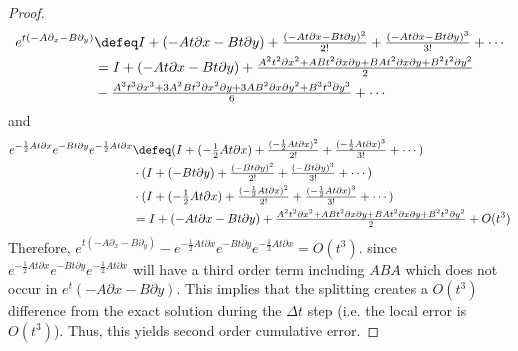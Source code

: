 \begin{answer}
\begin{proof}
        \begin{align}
            e^{t(-A\partial_x - B\partial_y)} &\defeq I + (-At\partial x - Bt\partial y) + \tfrac{(-At\partial x-Bt\partial y)^2}{2!} + \tfrac{(-At\partial x-Bt\partial y)^3}{3!} + \cdots\\
            &= I + (-At\partial x - Bt\partial y) + \tfrac{A^2t^2\partial x^2 + ABt^2\partial x \partial y + BA t^2 \partial x \partial y + B^2t^2\partial y^2}{2}\\
            &- \tfrac{A^3t^3\partial x^3 + 3A^2Bt^3\partial x^2 \partial y + 3AB^2 \partial x \partial y^2 + B^3t^3\partial y^3}{6} + \cdots
        \end{align}
        and
        \begin{align}
            e^{-\frac{1}{2}At\partial x}e^{-Bt\partial y}e^{-\frac{1}{2}At\partial x} &\defeq (I + (-\tfrac{1}{2}At\partial x) + \tfrac{(-\frac{1}{2}At \partial x)^2}{2!} + \tfrac{(-\frac{1}{2}At \partial x)^3}{3!} + \cdots)\\
            &\cdot(I + (-Bt\partial y) + \tfrac{(-Bt \partial y)^2}{2!} + \tfrac{(-Bt \partial y)^3}{3!} + \cdots)\\
            &\cdot(I + (-\tfrac{1}{2}At\partial x) + \tfrac{(-\frac{1}{2}At \partial x)^2}{2!} + \tfrac{(-\frac{1}{2}At \partial x)^3}{3!} + \cdots)\\
            &= I + (-At\partial x - Bt\partial y) + \tfrac{A^2t^2\partial x^2 + ABt^2\partial x \partial y + BA t^2 \partial x \partial y + B^2t^2\partial y^2}{2} + O(t^3)
        \end{align}
        Therefore, $e^{t(-A\partial_x - B\partial_y)} - e^{-\frac{1}{2}At\partial x}e^{-Bt\partial y}e^{-\frac{1}{2}At\partial x} = O(t^3)$. since $e^{-\frac{1}{2}At\partial x}e^{-Bt\partial y}e^{-\frac{1}{2}At\partial x}$ will have a third order term including $ABA$ which does not occur in $e^t(-A\partial x - B\partial y)$. This implies that the splitting creates a $O(t^3)$ difference from the exact solution during the $\Delta t$ step (i.e. the local error is $O(t^3)$). Thus, this yields second order cumulative error.
    \end{proof}
\end{answer}